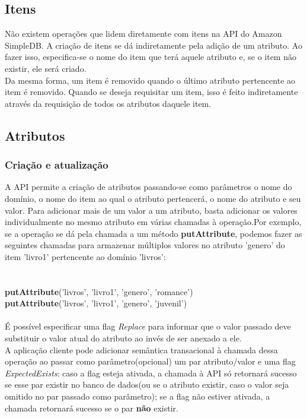 \subsection{Itens}
Não existem operações que lidem diretamente com itens na API do Amazon SimpleDB. A criação de itens se dá indiretamente pela adição de um atributo. Ao fazer isso, especifica-se o nome do item que terá aquele atributo e, se o item não existir, ele será criado. \\
Da mesma forma, um item é removido quando o último atributo pertencente ao item é removido. Quando se deseja requisitar um item, isso é feito indiretamente através da requisição de todos os atributos daquele item.

\subsection{Atributos}
\subsubsection{Criação e atualização}
A API permite a criação de atributos passando-se como parâmetros o nome do domínio, o nome do item ao qual o atributo pertencerá, o nome do atributo e seu valor. Para adicionar mais de um valor a um atributo, basta adicionar os valores individualmente no mesmo atributo em várias chamadas à operação.Por exemplo, se a operação se dá pela chamada a um método \textbf{putAttribute}, podemos fazer as seguintes chamadas para armazenar múltiplos valores no atributo 'genero' do item 'livro1' pertencente ao domínio 'livros':\\
\\\\
\textbf{putAttribute}('livros', 'livro1', 'genero', 'romance')\\
\textbf{putAttribute}('livros', 'livro1', 'genero', 'juvenil')
\\\\
É possível especificar uma flag \textit{Replace} para informar que o valor passado deve substituir o valor atual do atributo ao invés de ser anexado a ele.\\
A aplicação cliente pode adicionar semântica transacional à chamada dessa operação ao passar como parâmetro(opcional) um par atributo/valor e uma flag \textit{ExpectedExists}: caso a flag esteja ativada, a chamada à API só retornará sucesso se esse par existir no banco de dados(ou se o atributo existir, caso o valor seja omitido no par passado como parâmetro); se a flag não estiver ativada, a chamada retornará sucesso se o par \textbf{não} existir.

